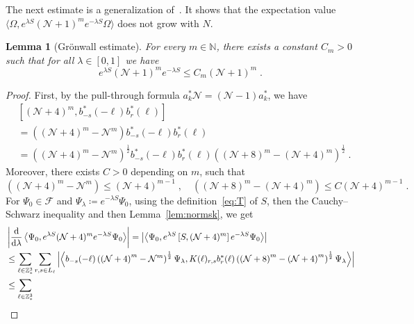 \documentclass[12pt,a4paper]{article}
\numberwithin{equation}{section}
\newcommand{\cF}{\mathcal{F}}
\newcommand{\NNN}{\mathbb{N}}
\newcommand{\1}{\mathbb{I}}
\newcommand{\di}{\textnormal{d}}
\newcommand{\HS}{\mathrm{HS}}
\newcommand{\Ncal}{\mathcal{N}}
\newcommand{\Z}{\mathbb{Z}}
\newcommand{\NN}{\mathcal{N}}
\newcommand{\half}{\frac{1}{2}}
\newcommand{\eva}[1]{\left\langle #1 \right\rangle}
\theoremstyle{plain}
\newtheorem{lemma}[theorem]{Lemma}
\theoremstyle{definition}
\theoremstyle{remark}
\theoremstyle{plain}
\theoremstyle{definition}
\theoremstyle{remark}
\begin{document}
The next estimate is a generalization of~\cite[Prop.~5.8]{CHN21}. It shows that the expectation value $ \langle \Omega, e^{\lambda S} (\mathcal{N} + 1)^m e^{-\lambda S} \Omega \rangle$ does not grow with $N$.

\begin{lemma}[Gr\"onwall estimate]\label{lem:gronNest}
For every $ m \in \NNN $, there exists a constant $ C_m > 0 $ such that for all $ \lambda\in [0,1]$ we have
\begin{equation}\label{eq:gronest}
	e^{\lambda S} (\mathcal{N} +1)^m e^{-\lambda S}
	\leq C_m (\NN+1)^m \;.
\end{equation}
\end{lemma}
\begin{proof}
First, by the pull-through formula $a^*_k \Ncal = (\Ncal - 1) a^*_k$, we have
\begin{align}
	& \left[(\NN+4)^m, b^*_{-s}(-\ell)b^*_{r}(\ell)\right] \\
	&= \left( (\NN+4)^m - \NN^m \right) b^*_{-s}(-\ell)b^*_{r}(\ell) \\
	&= \left( \left(\NN+4\right)^m - \NN^m \right)^\half b^*_{-s}(-\ell)b^*_{r}(\ell) \left( \left(\NN+8\right)^m - \left(\NN+4\right)^m \right)^\half \;.
\end{align}
Moreover, there exists $ C > 0 $ depending on $ m $, such that
\begin{equation}
	\left( \left(\NN+4\right)^m - \NN^m \right)
	\leq \left(\NN+4\right)^{m-1} \;, \quad
	\left( \left(\NN+8\right)^m - \left(\NN+4\right)^m \right)
	\leq C \left(\NN+4\right)^{m-1} \;.
\end{equation}
For $ \Psi_0 \in \cF $ and $ \Psi_\lambda \coloneq e^{-\lambda S} \Psi_0 $, using the definition~\eqref{eq:T} of $ S $, then the Cauchy--Schwarz inequality and then Lemma~\ref{lem:normsk}, we get
\begin{align}
	&\left|\frac{\di}{\di\lambda}\eva{\Psi_0, e^{\lambda S} (\mathcal{N}+4)^m e^{-\lambda S} \Psi_0 }\right|
	= \left| \eva{\Psi_0, e^{\lambda S} \left[S, (\NN+4)^m\right] e^{-\lambda S} \Psi_0}\right|\nonumber\\
	&\leq \sum_{\ell\in \mathbb{Z}^3_*}
		\sum_{r,s\in L_\ell} \abs{\eva{ b_{-s}(-\ell) \left( \left(\NN+4\right)^m - \NN^m \right)^\half \Psi_\lambda, K(\ell)_{r,s} b^*_{r}(\ell) \left( \left(\NN+8\right)^m - \left(\NN+4\right)^m \right)^\half \Psi_\lambda }}\nonumber\\
	&\leq \sum_{\ell\in \mathbb{Z}^3_*}

\end{align}
\end{proof}
\end{document}
